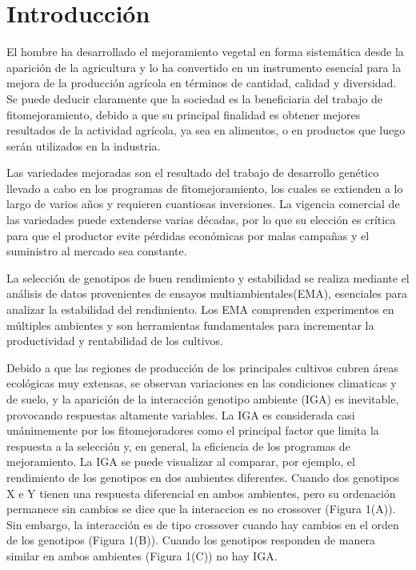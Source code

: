 

\chapter{Introducción}

El hombre ha desarrollado el mejoramiento vegetal en forma sistemática desde la aparición de la agricultura y lo ha convertido en un instrumento esencial para la mejora de la producción agrícola en términos de cantidad, calidad y diversidad. Se puede deducir claramente que la sociedad es la beneficiaria del trabajo de fitomejoramiento, debido a que su principal finalidad es obtener mejores resultados de la actividad agrícola, ya sea en alimentos, o en productos que luego serán utilizados en la industria. 

Las variedades mejoradas son el resultado del trabajo de desarrollo genético llevado a cabo en los programas de fitomejoramiento, los cuales se extienden a lo largo de varios años y requieren cuantiosas inversiones. La vigencia comercial de las variedades puede extenderse varias décadas, por lo que su elección es crítica para que el productor evite pérdidas económicas por malas campañas y el suministro al mercado sea constante. 

La selección de genotipos de buen rendimiento y estabilidad se realiza mediante el análisis de datos provenientes de ensayos multiambientales(EMA), esenciales para analizar la estabilidad del rendimiento. Los EMA comprenden experimentos en múltiples ambientes y son herramientas fundamentales para incrementar la productividad y rentabilidad de los cultivos.

Debido a que las regiones de producción de los principales cultivos cubren áreas ecológicas muy extensas, se observan variaciones en las condiciones climaticas y de suelo, y la aparición de la interacción genotipo ambiente (IGA) es inevitable, provocando respuestas altamente variables. La IGA es considerada casi unánimemente por los fitomejoradores como el
principal factor que limita la respuesta a la selección y, en general, la eficiencia de los programas de mejoramiento.  
La IGA se puede visualizar al comparar, por ejemplo, el rendimiento de los genotipos en dos ambientes diferentes. Cuando dos genotipos X e Y tienen una respuesta diferencial en ambos ambientes, pero su ordenación permanece sin cambios se dice que la interaccion es no crossover (Figura 1(A)). Sin embargo, la interacción es de tipo crossover cuando hay cambios en el orden de los genotipos (Figura  1(B)). Cuando los genotipos responden de manera similar en ambos ambientes (Figura 1(C)) no hay IGA. 

